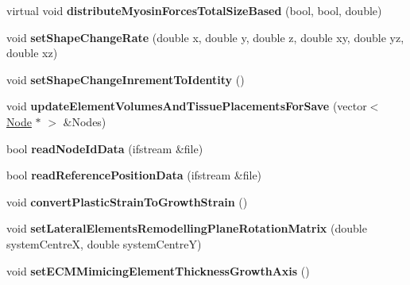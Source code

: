 \begin{DoxyCompactItemize}
\item 
\hypertarget{classShapeBase_aa410e608334905dc972b0c16c3998919}{}virtual void {\bfseries distribute\+Myosin\+Forces\+Total\+Size\+Based} (bool, bool, double)\label{classShapeBase_aa410e608334905dc972b0c16c3998919}

\item 
\hypertarget{classShapeBase_a8a9f91384133d8953dbb38d71cc29d51}{}void {\bfseries set\+Shape\+Change\+Rate} (double x, double y, double z, double xy, double yz, double xz)\label{classShapeBase_a8a9f91384133d8953dbb38d71cc29d51}

\item 
\hypertarget{classShapeBase_adacee19f788f056fe794bde14b934063}{}void {\bfseries set\+Shape\+Change\+Inrement\+To\+Identity} ()\label{classShapeBase_adacee19f788f056fe794bde14b934063}

\item 
\hypertarget{classShapeBase_a6e36c21c648f06a0e0693b3c34472fe5}{}void {\bfseries update\+Element\+Volumes\+And\+Tissue\+Placements\+For\+Save} (vector$<$ \hyperlink{classNode}{Node} $\ast$ $>$ \&Nodes)\label{classShapeBase_a6e36c21c648f06a0e0693b3c34472fe5}

\item 
\hypertarget{classShapeBase_acbd21b1daca4a94c5919147ae8c463d6}{}bool {\bfseries read\+Node\+Id\+Data} (ifstream \&file)\label{classShapeBase_acbd21b1daca4a94c5919147ae8c463d6}

\item 
\hypertarget{classShapeBase_a37a16216b042486dfdcbb16d8366eb7f}{}bool {\bfseries read\+Reference\+Position\+Data} (ifstream \&file)\label{classShapeBase_a37a16216b042486dfdcbb16d8366eb7f}

\item 
\hypertarget{classShapeBase_a78d45ea18373ce5e21b7567e9e6bdabc}{}void {\bfseries convert\+Plastic\+Strain\+To\+Growth\+Strain} ()\label{classShapeBase_a78d45ea18373ce5e21b7567e9e6bdabc}

\item 
\hypertarget{classShapeBase_abad6253cc3a8a9d4c475967a96606de1}{}void {\bfseries set\+Lateral\+Elements\+Remodelling\+Plane\+Rotation\+Matrix} (double system\+Centre\+X, double system\+Centre\+Y)\label{classShapeBase_abad6253cc3a8a9d4c475967a96606de1}

\item 
\hypertarget{classShapeBase_aaec4fe1a744c8e584c843c2b775bf7ca}{}void {\bfseries set\+E\+C\+M\+Mimicing\+Element\+Thickness\+Growth\+Axis} ()\label{classShapeBase_aaec4fe1a744c8e584c843c2b775bf7ca}


\end{DoxyCompactItemize}
